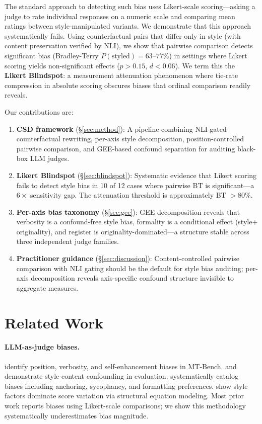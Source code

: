 \documentclass[11pt]{article}
\begin{document}
The standard approach to detecting such bias uses Likert-scale scoring---asking a judge to rate individual responses on a numeric scale and comparing mean ratings between style-manipulated variants.
We demonstrate that this approach systematically fails.
Using counterfactual pairs that differ only in style (with content preservation verified by NLI), we show that pairwise comparison detects significant bias (Bradley-Terry $P(\text{styled}) = 63$--$77\%$) in settings where Likert scoring yields non-significant effects ($p > 0.15$, $d < 0.06$).
We term this the \textbf{Likert Blindspot}: a measurement attenuation phenomenon where tie-rate compression in absolute scoring obscures biases that ordinal comparison readily reveals.

Our contributions are:

\begin{enumerate}
\item \textbf{CSD framework} (\S\ref{sec:method}): A pipeline combining NLI-gated counterfactual rewriting, per-axis style decomposition, position-controlled pairwise comparison, and GEE-based confound separation for auditing black-box LLM judges.

\item \textbf{Likert Blindspot} (\S\ref{sec:blindspot}): Systematic evidence that Likert scoring fails to detect style bias in 10 of 12 cases where pairwise BT is significant---a $6\times$ sensitivity gap. The attenuation threshold is approximately BT $> 80\%$.

\item \textbf{Per-axis bias taxonomy} (\S\ref{sec:gee}): GEE decomposition reveals that verbosity is a confound-free style bias, formality is a conditional effect (style$+$originality), and register is originality-dominated---a structure stable across three independent judge families.

\item \textbf{Practitioner guidance} (\S\ref{sec:discussion}): Content-controlled pairwise comparison with NLI gating should be the default for style bias auditing; per-axis decomposition reveals axis-specific confound structure invisible to aggregate measures.
\end{enumerate}

\section{Related Work}
\label{sec:related}

\paragraph{LLM-as-judge biases.}
\citet{zheng2023judging} identify position, verbosity, and self-enhancement biases in MT-Bench.
\citet{wu2024style} and \citet{park2024offsetbias} demonstrate style-content confounding in evaluation.
\citet{stureborg2024large} systematically catalog biases including anchoring, sycophancy, and formatting preferences.
\citet{koo2023benchmarking} show style factors dominate score variation via structural equation modeling.
Most prior work reports biases using Likert-scale comparisons; we show this methodology systematically underestimates bias magnitude.
\end{document}
